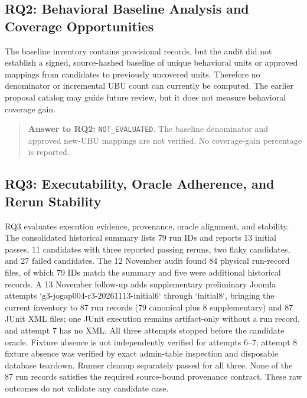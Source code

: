 \documentclass[pdflatex,sn-mathphys-num]{sn-jnl}
\begin{document}
\subsection{RQ2: Behavioral Baseline Analysis and Coverage Opportunities}

The baseline inventory contains provisional records, but the audit did not establish a signed, source-hashed baseline of unique behavioral units or approved mappings from candidates to previously uncovered units. Therefore no denominator or incremental UBU count can currently be computed. The earlier proposal catalog may guide future review, but it does not measure behavioral coverage gain.

\begin{quote}
\textbf{Answer to RQ2:} \texttt{NOT\_EVALUATED}. The baseline denominator and approved new-UBU mappings are not verified. No coverage-gain percentage is reported.
\end{quote}

\subsection{RQ3: Executability, Oracle Adherence, and Rerun Stability}

RQ3 evaluates execution evidence, provenance, oracle alignment, and stability. The consolidated historical summary lists 79 run IDs and reports 13 initial passes, 11 candidates with three reported passing reruns, two flaky candidates, and 27 failed candidates. The 12 November audit found 84 physical run-record files, of which 79 IDs match the summary and five were additional historical records. A 13 November follow-up adds supplementary preliminary Joomla attempts `g3-jogap004-r3-20261113-initial6` through `initial8`, bringing the current inventory to 87 run records (79 canonical plus 8 supplementary) and 87 JUnit XML files; one JUnit execution remains artifact-only without a run record, and attempt 7 has no XML. All three attempts stopped before the candidate oracle. Fixture absence is not independently verified for attempts 6–7; attempt 8 fixture absence was verified by exact admin-table inspection and disposable database teardown. Runner cleanup separately passed for all three. None of the 87 run records satisfies the required source-bound provenance contract. These raw outcomes do not validate any candidate case.
\end{document}
